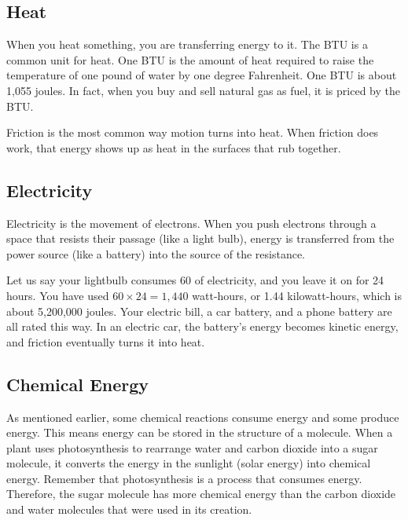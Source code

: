 \subsection{Heat}

When you heat something, you are transferring energy to it. The BTU is a common 
unit for heat. One BTU is the amount of heat required to raise the temperature of 
one pound of water by one degree Fahrenheit. One BTU is about 1,055 joules. In fact, when 
you buy and sell natural gas as fuel, it is priced by the BTU. 

Friction is the most common way motion turns into heat. When friction does work, that energy shows up as heat in the surfaces that rub together.

\subsection{Electricity}

Electricity is the movement of electrons. When you push electrons through a space 
that resists their passage (like a light bulb), energy is transferred from the 
power source (like a battery) into the source of the resistance.

Let us say your lightbulb consumes 60  of electricity, and you leave it on 
for 24 hours. You have used $60 \times 24 = 1{,}440$ watt-hours, or 1.44 kilowatt-hours, which is about 5,200,000 joules. Your electric bill, a car battery, and a phone battery are all rated this way. In an electric car, the battery's energy becomes kinetic energy, and friction eventually turns it into heat.


\subsection{Chemical Energy}

As mentioned earlier, some chemical reactions consume energy and some produce 
energy. This means energy can be stored in the structure of a molecule. When a 
plant uses photosynthesis to rearrange water and carbon dioxide into a sugar 
molecule, it converts the energy in the sunlight (solar energy) into chemical 
energy. Remember that photosynthesis is a process that consumes energy. 
Therefore, the sugar molecule has more chemical energy than the carbon dioxide 
and water molecules that were used in its creation.


